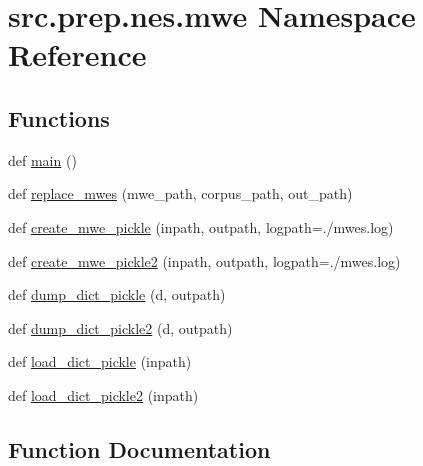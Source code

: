 \hypertarget{namespacesrc_1_1prep_1_1nes_1_1mwe}{}\section{src.\+prep.\+nes.\+mwe Namespace Reference}
\label{namespacesrc_1_1prep_1_1nes_1_1mwe}
\subsection*{Functions}
\begin{DoxyCompactItemize}
\item 
def \hyperlink{namespacesrc_1_1prep_1_1nes_1_1mwe_ac7f9aee93bfa225fccd5bb00340cb347}{main} ()
\item 
def \hyperlink{namespacesrc_1_1prep_1_1nes_1_1mwe_a01901533abaa87624a51fc18ee89125d}{replace\+\_\+mwes} (mwe\+\_\+path, corpus\+\_\+path, out\+\_\+path)
\item 
def \hyperlink{namespacesrc_1_1prep_1_1nes_1_1mwe_a16e74326b27b51dfb850967ca418f878}{create\+\_\+mwe\+\_\+pickle} (inpath, outpath, logpath=\textquotesingle{}./mwes.\+log\textquotesingle{})
\item 
def \hyperlink{namespacesrc_1_1prep_1_1nes_1_1mwe_af2d0d3f334f0f2e303565b4b3c63d0d6}{create\+\_\+mwe\+\_\+pickle2} (inpath, outpath, logpath=\textquotesingle{}./mwes.\+log\textquotesingle{})
\item 
def \hyperlink{namespacesrc_1_1prep_1_1nes_1_1mwe_abdc0973a208dda3645bfccbd03e9328b}{dump\+\_\+dict\+\_\+pickle} (d, outpath)
\item 
def \hyperlink{namespacesrc_1_1prep_1_1nes_1_1mwe_a812a0a260adb99b2f341f6c1d6086966}{dump\+\_\+dict\+\_\+pickle2} (d, outpath)
\item 
def \hyperlink{namespacesrc_1_1prep_1_1nes_1_1mwe_a83ed4914c15adeb0d03b643d229a80b9}{load\+\_\+dict\+\_\+pickle} (inpath)
\item 
def \hyperlink{namespacesrc_1_1prep_1_1nes_1_1mwe_a3294ef392c03cdd2c493f22123d53ea3}{load\+\_\+dict\+\_\+pickle2} (inpath)
\end{DoxyCompactItemize}


\subsection{Function Documentation}

